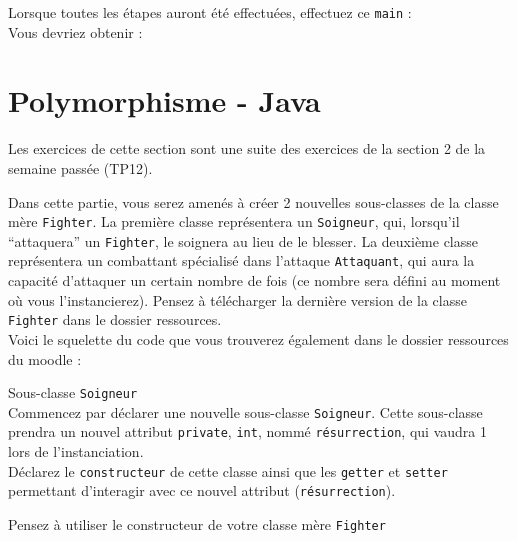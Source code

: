 Lorsque toutes les étapes auront été effectuées, effectuez ce \lstinline{main} : \\




Vous devriez obtenir : \\




\newpage
\section{Polymorphisme - Java}

Les exercices de cette section sont une suite des exercices de la section 2 de la semaine passée (TP12).

Dans cette partie, vous serez amenés à créer 2 nouvelles sous-classes de la classe mère \lstinline{Fighter}. La première classe représentera un \lstinline{Soigneur}, qui, lorsqu'il ``attaquera'' un \lstinline{Fighter}, le soignera au lieu de le blesser. La deuxième classe représentera un combattant spécialisé dans l'attaque \lstinline{Attaquant}, qui aura la capacité d'attaquer un certain nombre de fois (ce nombre sera défini au moment où vous l'instancierez). Pensez à télécharger la dernière version de la classe \lstinline{Fighter} dans le dossier ressources.\\

Voici le squelette du code que vous trouverez également dans le dossier ressources du moodle : \\



\begin{Exercice}[5 minutes] Sous-classe \lstinline{Soigneur} \\

Commencez par déclarer une nouvelle sous-classe \lstinline{Soigneur}. Cette sous-classe prendra un nouvel attribut \lstinline{private}, \lstinline{int}, nommé \lstinline{résurrection}, qui vaudra 1 lors de l'instanciation. \\

Déclarez le \lstinline{constructeur} de cette classe ainsi que les \lstinline{getter} et \lstinline{setter} permettant d'interagir avec ce nouvel attribut (\lstinline{résurrection}). \\

\begin{conseil}
Pensez à utiliser le constructeur de votre classe mère \lstinline{Fighter}
\end{conseil}

\begin{solution}
	
\end{solution}

\end{Exercice}


